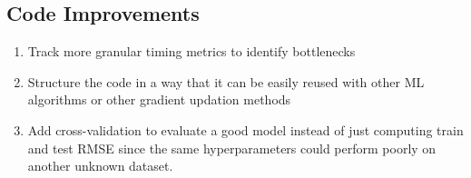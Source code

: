 \documentclass{article}
\begin{document}
\subsection{Code Improvements}
\begin{enumerate}
    \item Track more granular timing metrics to identify bottlenecks
    \item Structure the code in a way that it can be easily reused with other ML algorithms or other gradient updation methods
    \item Add cross-validation to evaluate a good model instead of just computing train and test RMSE since the same hyperparameters could perform poorly on another unknown dataset.
\end{enumerate}
\end{document}
